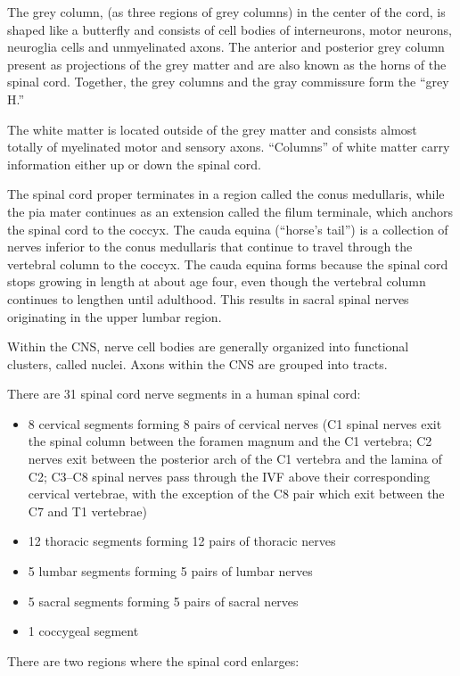 The grey column, (as three regions of grey columns) in the center of the cord, is shaped like a butterfly and consists of cell bodies of interneurons, motor neurons, neuroglia cells and unmyelinated axons. The anterior and posterior grey column present as projections of the grey matter and are also known as the horns of the spinal cord. Together, the grey columns and the gray commissure form the ``grey H.''

The white matter is located outside of the grey matter and consists almost totally of myelinated motor and sensory axons. ``Columns'' of white matter carry information either up or down the spinal cord.

The spinal cord proper terminates in a region called the conus medullaris, while the pia mater continues as an extension called the filum terminale, which anchors the spinal cord to the coccyx. The cauda equina (``horse's tail'') is a collection of nerves inferior to the conus medullaris that continue to travel through the vertebral column to the coccyx. The cauda equina forms because the spinal cord stops growing in length at about age four, even though the vertebral column continues to lengthen until adulthood. This results in sacral spinal nerves originating in the upper lumbar region.

Within the CNS, nerve cell bodies are generally organized into functional clusters, called nuclei. Axons within the CNS are grouped into tracts.

There are 31 spinal cord nerve segments in a human spinal cord:

\begin{itemize}
\tightlist
\item
  8 cervical segments forming 8 pairs of cervical nerves (C1 spinal nerves exit the spinal column between the foramen magnum and the C1 vertebra; C2 nerves exit between the posterior arch of the C1 vertebra and the lamina of C2; C3--C8 spinal nerves pass through the IVF above their corresponding cervical vertebrae, with the exception of the C8 pair which exit between the C7 and T1 vertebrae)
\item
  12 thoracic segments forming 12 pairs of thoracic nerves
\item
  5 lumbar segments forming 5 pairs of lumbar nerves
\item
  5 sacral segments forming 5 pairs of sacral nerves
\item
  1 coccygeal segment
\end{itemize}

There are two regions where the spinal cord enlarges:


